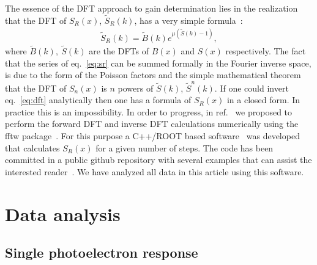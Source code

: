 \documentclass[a4paper,11pt]{article}
\begin{document}

The essence of the DFT approach to gain determination lies in the realization that the DFT of $S_R(x)$, $\tilde S_R(k)$, has a very simple formula~\cite{me}:
\begin{align}
\tilde S_R(k) = \tilde B(k) e^{ \mu( \tilde S(k) - 1 ) } , \label{eq:dft}
\end{align}
where $\tilde B(k), \ \tilde S(k)$ are the DFTs of $B(x)$ and $S(x)$ respectively. 
The fact that the series of eq.~\eqref{eq:sr} can be summed formally in the Fourier inverse space, 
is due to the form of the Poisson factors and the simple mathematical theorem that the DFT of $S_n(x)$ is $n$ powers of $\tilde S(k)$, $\tilde S^n(k)$. 
If one could invert eq.~\eqref{eq:dft} analytically then one has a formula of $S_R(x)$ in a closed form. In practice this is an impossibility.  
In order to progress, in ref.~\cite{me} we proposed to perform the forward DFT and inverse DFT calculations numerically using the fftw package~\cite{fftw}. 
For this purpose a C++/ROOT based software~\cite{root} was developed that calculates $S_R(x)$ for a given number of steps.
The code has been committed in a public github repository with several examples that can assist the interested reader~\cite{git}. 
We have analyzed all data in this article using this software. 


\section{Data analysis}
\label{sec:data}
%

\subsection{Single photoelectron response}
 
\end{document}
